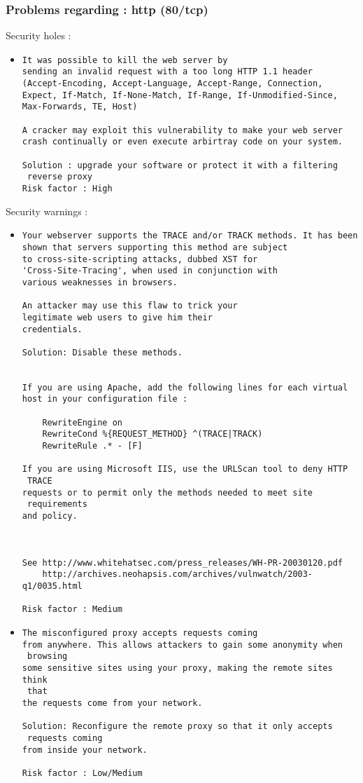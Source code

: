 \documentclass{article}
\begin{document}
\subsubsection{Problems regarding : http (80/tcp)}
Security holes :\\
\begin{itemize}
\item \begin{verbatim}
It was possible to kill the web server by
sending an invalid request with a too long HTTP 1.1 header
(Accept-Encoding, Accept-Language, Accept-Range, Connection, 
Expect, If-Match, If-None-Match, If-Range, If-Unmodified-Since,
Max-Forwards, TE, Host)

A cracker may exploit this vulnerability to make your web server
crash continually or even execute arbirtray code on your system.

Solution : upgrade your software or protect it with a filtering
 reverse proxy
Risk factor : High
\end{verbatim}\end{itemize}
Security warnings :\\
\begin{itemize}
\item \begin{verbatim}
Your webserver supports the TRACE and/or TRACK methods. It has been
shown that servers supporting this method are subject
to cross-site-scripting attacks, dubbed XST for
'Cross-Site-Tracing', when used in conjunction with
various weaknesses in browsers.

An attacker may use this flaw to trick your
legitimate web users to give him their 
credentials.

Solution: Disable these methods.


If you are using Apache, add the following lines for each virtual
host in your configuration file :

    RewriteEngine on
    RewriteCond %{REQUEST_METHOD} ^(TRACE|TRACK)
    RewriteRule .* - [F]

If you are using Microsoft IIS, use the URLScan tool to deny HTTP
 TRACE
requests or to permit only the methods needed to meet site
 requirements
and policy.



See http://www.whitehatsec.com/press_releases/WH-PR-20030120.pdf
    http://archives.neohapsis.com/archives/vulnwatch/2003-q1/0035.html

Risk factor : Medium
\end{verbatim}\item \begin{verbatim}
The misconfigured proxy accepts requests coming
from anywhere. This allows attackers to gain some anonymity when
 browsing 
some sensitive sites using your proxy, making the remote sites think
 that
the requests come from your network.

Solution: Reconfigure the remote proxy so that it only accepts
 requests coming 
from inside your network.
 
Risk factor : Low/Medium
\end{verbatim}\end{itemize}
\end{document}
